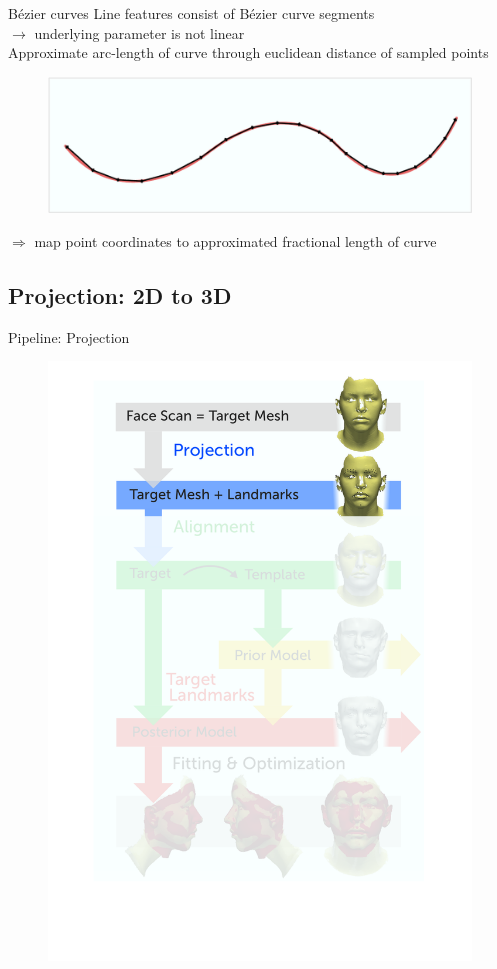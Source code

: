 \documentclass[xcolor=x11names,compress]{beamer}
\begin{document}
    \begin{frame}{B\'{e}zier curves}
        Line features consist of B\'{e}zier curve segments\\
        $\rightarrow$ underlying parameter is not linear\\
        \bigskip
        Approximate arc-length of curve through euclidean distance of sampled points\\
        \begin{figure}
            \centering
            \includegraphics[width=.7\textwidth]{../resources/figures/distance_computation.pdf}
        \end{figure}
        $\Rightarrow$ map point coordinates to approximated fractional length of curve
    \end{frame}

    \subsection{Projection: 2D to 3D}
    \begin{frame}{Pipeline: Projection}
        \begin{figure}   
            \centering
            \includegraphics[width=.6\textwidth]{../resources/figures/pipeline_projection.pdf}
        \end{figure}
    \end{frame}
\end{document}
